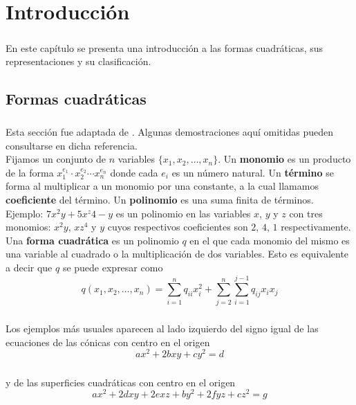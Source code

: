 \chapter{Introducción}
\paragraph*{}
En este capítulo se presenta una introducción a las formas cuadráticas, sus representaciones y su clasificación.
\section{Formas cuadráticas}
\paragraph*{}
Esta sección fue adaptada de \citep{LayDavidC2001Alys}. Algunas demostraciones aquí omitidas pueden consultarse en dicha referencia.\\
Fijamos un conjunto de $n$ variables $\{x_1, x_2, \ldots, x_n\}$. Un \textbf{monomio} es un producto de la forma $x_{1}^{e_{1}} \cdot x_{2}^{e_{2}} \cdots x_{n}^{e_{n}}$ donde cada $e_{i}$ es un número natural. Un \textbf{término} se forma al multiplicar a un monomio por una constante, a la cual llamamos \textbf{coeficiente} del término. Un \textbf{polinomio} es una suma finita de términos.\\
Ejemplo: $7x^{2}y + 5x^z{4} - y$ es un polinomio en las variables $x$, $y$ y $z$ con tres monomios: $x^{2}y$, $xz^{4}$ y $y$ cuyos respectivos coeficientes son $2$, $4$, $1$ respectivamente.\\
Una \textbf{forma cuadrática} es un polinomio $q$ en el que cada monomio del mismo es una variable al cuadrado o la multiplicación de dos variables. Esto es equivalente a decir que $q$ se puede expresar como
\begin{equation*}
q(x_{1}, x_{2}, \ldots, x_{n}) = \sum_{i=1}^{n} q_{ii}x_{i}^{2}+ \sum_{j=2}^{n}\sum_{i=1}^{j-1} q_{ij}x_{i}x_{j}
\end{equation*}
\paragraph*{}
Los ejemplos más usuales aparecen al lado izquierdo del signo igual de las ecuaciones de las cónicas con centro en el origen
\begin{equation*}
ax^{2} + 2bxy + cy^{2} = d
\end{equation*}
\paragraph*{}
y de las superficies cuadráticas con centro en el origen
\begin{equation*}
ax^{2} + 2dxy + 2exz + by^{2} + 2fyz + cz^{2} = g
\end{equation*}


